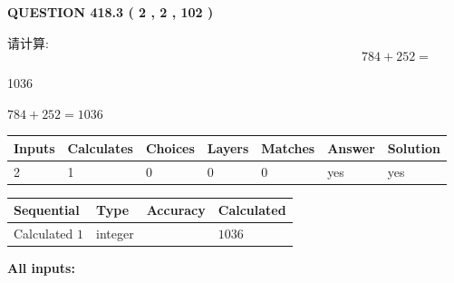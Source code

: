 \documentclass{ctexart}
\begin{document}
{\textbf{\Large{QUESTION
418.3 
 ( 2 , 2 , 102 )
}}}
  
  
 
请计算:
\begin{equation}
784 +  %
252 = \nonumber
\end{equation}
 
 
 
\noindent{}
 
 

1036
 
 
\noindent{}
 
 

 
 
 
\noindent{}
 
 

$ %
784 +  %
252=   %
1036$
 
 
\noindent{}
 
 

 
   
   
   
   
\noindent\begin{tabular}{|l|l|l|l|l|l|l|}
 \hline
Inputs & Calculates & Choices & Layers & Matches & Answer & Solution \\ \hline
 2  & 
 1  & 
 0
  & 
 0  & 
 0  & 
  yes & 
  yes 
  \\ \hline
 \end{tabular}
   
   
   
   
\noindent{}
   
   
  
  
\noindent\begin{tabular}{|l|l|l|l|}
\hline
 Sequential & Type & Accuracy & Calculated \\ 
\hline
 
 
  Calculated $  1 $ & integer &  & 
  $ 1036 $ 
 \\  \hline  
 \end{tabular}
   
   
   
   
\noindent\vspace{0.1in}\hspace{-0.08in} {\textbf{\Large{All inputs: }}}
   
\end{document}
